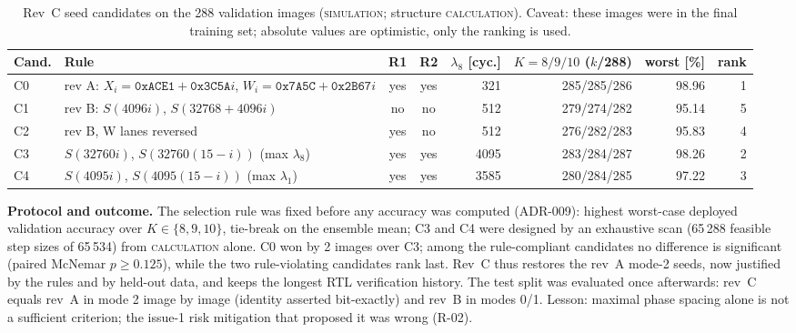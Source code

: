 \documentclass[10pt,a4paper]{article}
\newcommand{\lbl}[1]{\textsc{#1}}          %
\begin{document}
\begin{table}[htbp]
\centering\small
\caption{Rev~C seed candidates on the 288 validation images
(\lbl{simulation}; structure \lbl{calculation}). Caveat: these images were in
the final training set; absolute values are optimistic, only the ranking is
used.}\label{tab:cand}
\begin{tabularx}{\linewidth}{@{}lLccrrrr@{}}
\toprule
Cand. & Rule & R1 & R2 & $\lambda_8$ [cyc.] & $K=8/9/10$ ($k$/288) & worst [\%] & rank\\
\midrule
C0 & rev A: $X_i=\texttt{0xACE1}+\texttt{0x3C5A}i$, $W_i=\texttt{0x7A5C}+\texttt{0x2B67}i$ & yes & yes & 321 & 285/285/286 & 98.96 & 1\\
C1 & rev B: $S(4096i)$, $S(32768+4096i)$ & no & no & 512 & 279/274/282 & 95.14 & 5\\
C2 & rev B, W lanes reversed & yes & no & 512 & 276/282/283 & 95.83 & 4\\
C3 & $S(32760i)$, $S(32760(15-i))$ (max $\lambda_8$) & yes & yes & 4095 & 283/284/287 & 98.26 & 2\\
C4 & $S(4095i)$, $S(4095(15-i))$ (max $\lambda_1$) & yes & yes & 3585 & 280/284/285 & 97.22 & 3\\
\bottomrule
\end{tabularx}
\end{table}
\textbf{Protocol and outcome.} The selection rule was fixed before any
accuracy was computed (ADR-009): highest worst-case deployed validation
accuracy over $K\in\{8,9,10\}$, tie-break on the ensemble mean; C3 and C4 were
designed by an exhaustive scan (65\,288 feasible step sizes of 65\,534) from
\lbl{calculation} alone. C0 won by 2 images over C3; among the rule-compliant
candidates no difference is significant (paired McNemar $p\ge0.125$), while
the two rule-violating candidates rank last. Rev~C thus restores the rev~A
mode-2 seeds, now justified by the rules and by held-out data, and keeps the
longest RTL verification history. The test split was evaluated once
afterwards: rev~C equals rev~A in mode 2 image by image (identity asserted
bit-exactly) and rev~B in modes 0/1. Lesson: maximal phase spacing alone is
not a sufficient criterion; the issue-1 risk mitigation that proposed it was
wrong (R-02).

\end{document}
